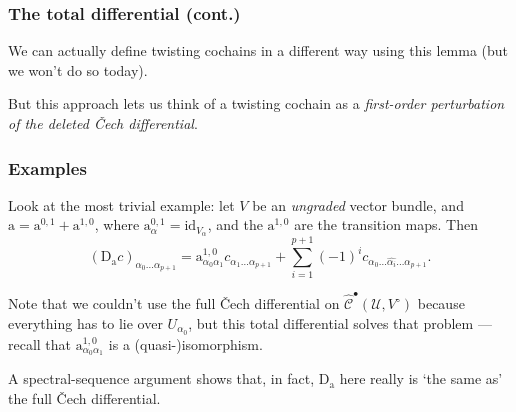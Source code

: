 \documentclass{beamer}
\begin{document}
            \begin{frame}\frametitle{The total differential (cont.)}
                We can actually define twisting cochains in a different way using this lemma (but we won't do so today).

                \pause

                But this approach lets us think of a twisting cochain as a \emph{first-order perturbation of the deleted Čech differential}.
            \end{frame}

            \begin{frame}\frametitle{Examples}
                \begin{example}
                    Look at the most trivial example: let $V$ be an \emph{ungraded} vector bundle, and $\mathrm{a} = \mathrm{a}^{0,1}+\mathrm{a}^{1,0}$, where $\mathrm{a}_{\alpha}^{0,1} = \mathrm{id}_{V_\alpha}$, and the $\mathrm{a}^{1,0}$ are the transition maps.
                    Then
                    \begin{equation*}
                        (\mathrm{D}_\mathrm{a}c)_{\alpha_0\ldots\alpha_{p+1}} = \mathrm{a}_{\alpha_0\alpha_1}^{1,0}c_{\alpha_1\ldots\alpha_{p+1}} + \sum_{i=1}^{p+1}(-1)^i c_{\alpha_0\ldots\widehat{\alpha_i}\ldots\alpha_{p+1}}.
                    \end{equation*}

                    \pause

                    Note that we couldn't use the full Čech differential on $\hat{\mathscr{C}}^\bullet(\mathcal{U},V^\circ)$ because everything has to lie over $U_{\alpha_0}$, but this total differential solves that problem --- recall that $\mathrm{a}_{\alpha_0\alpha_1}^{1,0}$ is a (quasi-)isomorphism.

                    \pause

                    A spectral-sequence argument shows that, in fact, $\mathrm{D}_\mathrm{a}$ here really is `the same as' the full Čech differential.
                \end{example}
            \end{frame}
\end{document}
